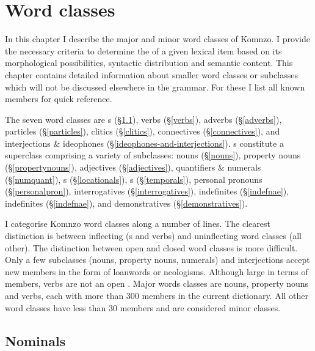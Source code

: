 \chapter{Word classes} \label{cha:word classes}

In this chapter I describe the major and minor word classes of Komnzo. I provide the necessary criteria to determine the  of a given lexical item based on its morphological possibilities, syntactic distribution and semantic content. This chapter contains detailed information about smaller word classes or subclasses which will not be discussed elsewhere in the grammar. For these I list all known members for quick reference.%

The seven word classes are s (\S{}\ref{nominals-intro}), verbs (\S{}\ref{verbs}), adverbs (\S{}\ref{adverbs}), particles (\S{}\ref{particles}), clitics (\S{}\ref{clitics}), connectives (\S{}\ref{connectives}), and interjections \& ideophones (\S{}\ref{ideophones-and-interjections}). s constitute a superclass comprising a variety of subclasses: nouns (\S{}\ref{nouns}), property nouns (\S{}\ref{propertynouns}), adjectives (\S{}\ref{adjectives}), quantifiers \& numerals (\S{}\ref{numquant}),  s (\S{}\ref{locationals}),  s (\S{}\ref{temporals}), personal pronouns (\S{}\ref{personalpron}), interrogatives (\S{}\ref{interrogatives}), indefinites (\S{}\ref{indefnae}), indefinites (\S{}\ref{indefnae}), and demonstratives (\S{}\ref{demonstratives}).%

I categorise Komnzo word classes along a number of lines. The clearest distinction is between inflecting (s and verbs) and uninflecting word classes (all other). The distinction between open and closed word classes is more difficult. Only a few  subclasses (nouns, property nouns, numerals) and interjections accept new members in the form of loanwords or neologisms. Although large in terms of members, verbs are not an open . Major words classes are nouns, property nouns and verbs, each with more than 300 members in the current dictionary. All other word classes have less than 30 members and are considered minor classes.

\section{Nominals} \label{nominals-intro}

